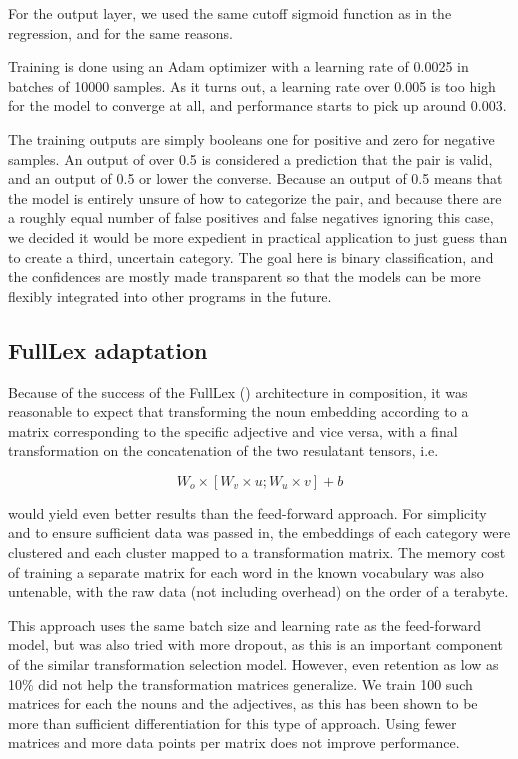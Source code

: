\documentclass[a4paper, 12pt]{article}
\begin{document}
For the output layer, we used the same cutoff sigmoid function as in the regression, and for the same reasons.

Training is done using an Adam optimizer with a learning rate of 0.0025 in batches of 10000 samples. As it turns out, a learning rate over 0.005 is too high for the model to converge at all, and performance starts to pick up around 0.003.

The training outputs are simply booleans \textemdash one for positive and zero for negative samples. An output of over 0.5 is considered a prediction that the pair is valid, and an output of 0.5 or lower the converse. Because an output of 0.5 means that the model is entirely unsure of how to categorize the pair, and because there are a roughly equal number of false positives and false negatives ignoring this case, we decided it would be more expedient in practical application to just guess than to create a third, uncertain category. The goal here is binary classification, and the confidences are mostly made transparent so that the models can be more flexibly integrated into other programs in the future.

\subsection{FullLex adaptation}
Because of the success of the FullLex (\cite{SocherFullLex}) architecture in composition, it was reasonable to expect that transforming the noun embedding according to a matrix corresponding to the specific adjective and vice versa, with a final transformation on the concatenation of the two resulatant tensors, i.e.

\begin{equation} \label{eq:6}
	W_o \times [W_v \times u; W_u \times v] + b
\end{equation}

would yield even better results than the feed-forward approach. For simplicity and to ensure sufficient data was passed in, the embeddings of each category were clustered and each cluster mapped to a transformation matrix. The memory cost of training a separate matrix for each word in the known vocabulary was also untenable, with the raw data (not including overhead) on the order of a terabyte.

This approach uses the same batch size and learning rate as the feed-forward model, but was also tried with more dropout, as this is an important component of the similar transformation selection model. However, even retention as low as 10\% did not help the transformation matrices generalize. We train 100 such matrices for each the nouns and the adjectives, as this has been shown to be more than sufficient differentiation for this type of approach. Using fewer matrices and more data points per matrix does not improve performance.
\end{document}
